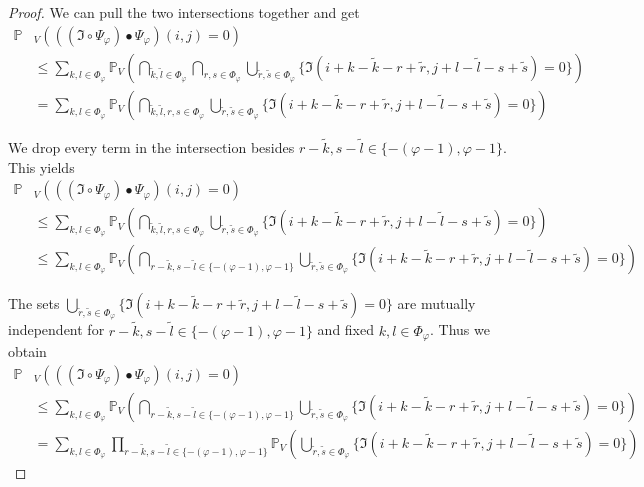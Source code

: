 \documentclass[a4paper,12pt]{article}
\theoremstyle{plain}
\theoremstyle{definition}
\begin{document}
\begin{appendix}
\begin{proof}
		We can pull the two intersections together and get
		\begin{align*}
			\mathbb{P}&_V( ((\mathfrak{I} \circ \Psi_\varphi) \bullet \Psi_\varphi)(i, j) = 0 ) \\
			&\leq \sum_{k, l \in \Phi_\varphi} \mathbb{P}_V\left( \bigcap_{\tilde{k}, \tilde{l} \in \Phi_\varphi} \bigcap_{r, s \in \Phi_\varphi} \bigcup_{\tilde{r}, \tilde{s} \in \Phi_\varphi} \{ \mathfrak{I}(i + k - \tilde{k} - r + \tilde{r}, j + l - \tilde{l} - s + \tilde{s}) = 0 \} \right) \\
			&= \sum_{k, l \in \Phi_\varphi} \mathbb{P}_V\left( \bigcap_{\tilde{k}, \tilde{l}, r, s \in \Phi_\varphi} \bigcup_{\tilde{r}, \tilde{s} \in \Phi_\varphi} \{ \mathfrak{I}(i + k - \tilde{k} - r + \tilde{r}, j + l - \tilde{l} - s + \tilde{s}) = 0 \} \right)
		\end{align*}
		
		We drop every term in the intersection besides $r - \tilde{k}, s - \tilde{l} \in \{ - ( \varphi - 1 ), \varphi - 1 \}$. This yields
		\begin{align*}
			\mathbb{P}&_V( ((\mathfrak{I} \circ \Psi_\varphi) \bullet \Psi_\varphi)(i, j) = 0 ) \\
			&\leq \sum_{k, l \in \Phi_\varphi} \mathbb{P}_V\left( \bigcap_{\tilde{k}, \tilde{l}, r, s \in \Phi_\varphi} \bigcup_{\tilde{r}, \tilde{s} \in \Phi_\varphi} \{ \mathfrak{I}(i + k - \tilde{k} - r + \tilde{r}, j + l - \tilde{l} - s + \tilde{s}) = 0 \} \right) \\
			&\leq \sum_{k, l \in \Phi_\varphi} \mathbb{P}_V\left( \bigcap_{r - \tilde{k}, s - \tilde{l} \in \{ - ( \varphi - 1 ), \varphi - 1 \}} \bigcup_{\tilde{r}, \tilde{s} \in \Phi_\varphi} \{ \mathfrak{I}(i + k - \tilde{k} - r + \tilde{r}, j + l - \tilde{l} - s + \tilde{s}) = 0 \} \right)
		\end{align*}
		
		The sets $\bigcup_{\tilde{r}, \tilde{s} \in \Phi_\varphi} \{ \mathfrak{I}(i + k - \tilde{k} - r + \tilde{r}, j + l - \tilde{l} - s + \tilde{s}) = 0 \}$ are mutually independent for $r - \tilde{k}, s - \tilde{l} \in \{ - ( \varphi - 1 ), \varphi - 1 \}$ and fixed $k, l \in \Phi_\varphi$. Thus we obtain
		\begin{align*}
			\mathbb{P}&_V( ((\mathfrak{I} \circ \Psi_\varphi) \bullet \Psi_\varphi)(i, j) = 0 ) \\
			&\leq \sum_{k, l \in \Phi_\varphi} \mathbb{P}_V\left( \bigcap_{r - \tilde{k}, s - \tilde{l} \in \{ - ( \varphi - 1 ), \varphi - 1 \}} \bigcup_{\tilde{r}, \tilde{s} \in \Phi_\varphi} \{ \mathfrak{I}(i + k - \tilde{k} - r + \tilde{r}, j + l - \tilde{l} - s + \tilde{s}) = 0 \} \right) \\
			&= \sum_{k, l \in \Phi_\varphi} \prod_{r - \tilde{k}, s - \tilde{l} \in \{ - ( \varphi - 1 ), \varphi - 1 \}} \mathbb{P}_V\left( \bigcup_{\tilde{r}, \tilde{s} \in \Phi_\varphi} \{ \mathfrak{I}(i + k - \tilde{k} - r + \tilde{r}, j + l - \tilde{l} - s + \tilde{s}) = 0 \} \right)
		\end{align*}
		

\end{proof}
\end{appendix}
\end{document}
